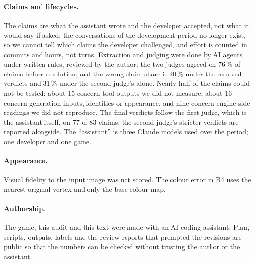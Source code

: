 \paragraph{Claims and lifecycles.} The claims are what the assistant wrote and the
developer accepted, not what it would say if asked; the conversations of the
development period no longer exist, so we cannot tell which claims the developer
challenged, and effort is counted in commits and hours, not turns. Extraction and
judging were done by AI agents under written rules, reviewed by the author; the two
judges agreed on 76\,\% of claims before resolution, and the wrong-claim share is
20\,\% under the resolved verdicts and 31\,\% under the second judge's alone.
Nearly half of the claims could not be tested: about 15 concern tool outputs we
did not measure, about 16 concern generation inputs, identities or appearance,
and nine concern engine-side readings we did not reproduce. The final verdicts
follow the first judge, which is the assistant itself, on 77 of 83 claims; the
second judge's stricter verdicts are reported alongside. The ``assistant'' is
three Claude models used over the period; one developer and one game.

\paragraph{Appearance.} Visual fidelity to the input image was not scored. The
colour error in B4 uses the nearest original vertex and only the base colour map.

\paragraph{Authorship.} The game, this audit and this text were made with an AI
coding assistant. Plan, scripts, outputs, labels and the review reports that
prompted the revisions are public so that the numbers can be checked without
trusting the author or the assistant.


